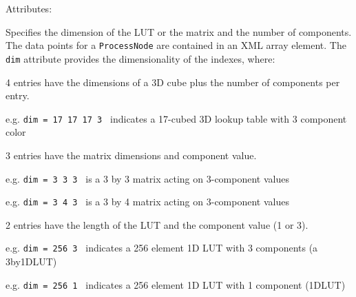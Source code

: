Attributes:
\begin{xmlfields}
	\xmlitem[dim][required] 	Specifies the dimension of the LUT or the matrix and the number of components. The data points for a \texttt{ProcessNode} are contained in an XML array element. The \texttt{dim} attribute provides the dimensionality of the indexes, where:

		4 entries have the dimensions of a 3D cube plus the number of components per entry.
		\begin{list}{}{\setlength{\itemsep}{4pt}\setlength{\topsep}{0pt}}
				\item e.g. \texttt{dim = 17 17 17 3 } indicates a 17-cubed 3D lookup table with 3 component color
		\end{list}

		3 entries have the matrix dimensions and component value.
		\begin{list}{}{\setlength{\itemsep}{4pt}\setlength{\topsep}{0pt}}
				\item e.g. \texttt{dim = 3 3 3 } is a 3 by 3 matrix acting on 3-component values
				\item e.g. \texttt{dim = 3 4 3 } is a 3 by 4 matrix acting on 3-component values
		\end{list}

		2 entries have the length of the LUT and the component value (1 or 3).
		\begin{list}{}{\setlength{\itemsep}{4pt}\setlength{\topsep}{0pt}}
				\item e.g. \texttt{dim = 256 3 } indicates a 256 element 1D LUT with 3 components (a 3by1DLUT)
				\item e.g. \texttt{dim = 256 1 } indicates a 256 element 1D LUT with 1 component (1DLUT)
		\end{list}
\end{xmlfields}
